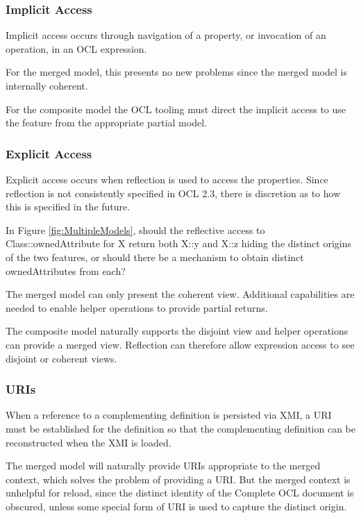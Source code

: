\documentclass{eceasst}
\begin{document}
\subsubsection{Implicit Access}

Implicit access occurs through navigation of a property, or invocation of an operation, in an OCL expression.

For the merged model, this presents no new problems since the merged model is internally coherent.

For the composite model the OCL tooling must direct the implicit access to use the feature from the appropriate partial model.

\subsubsection{Explicit Access}

Explicit access occurs when reflection is used to access the properties. Since reflection is not consistently specified in OCL 2.3, there is discretion as to how this is specified in the future.

In Figure \ref{fig:MultipleModels}, should the reflective access to Class::ownedAttribute for X return both X::y and X::z hiding the distinct origins of the two features, or should there be a mechanism to obtain distinct ownedAttributes from each?

The merged model can only present the coherent view. Additional capabilities are needed to enable helper operations to provide partial returns.

The composite model naturally supports the disjoint view and helper operations can provide a merged view. Reflection can therefore allow expression access to see disjoint or coherent views.

\subsubsection{URIs}

When a reference to a complementing definition is persisted via XMI, a URI must be established for the definition so that the complementing definition can be reconstructed when the XMI is loaded.

The merged model will naturally provide URIs appropriate to the merged context, which solves the problem of providing a URI. But the merged context is unhelpful for reload, since the distinct identity of the Complete OCL document is obscured, unless some special form of URI is used to capture the distinct origin.
\end{document}
